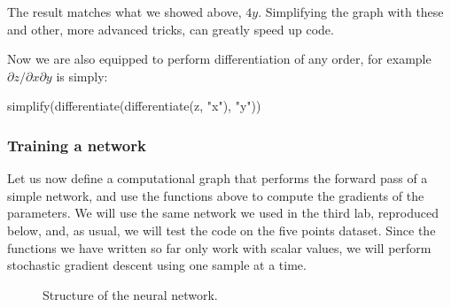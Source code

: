 \documentclass[
  a4paper,
]{article}
\newenvironment{Shaded}{\begin{snugshade}}{\end{snugshade}}
\newcommand{\FunctionTok}[1]{\textcolor[rgb]{0.00,0.00,0.00}{#1}}
\newcommand{\NormalTok}[1]{#1}
\newcommand{\StringTok}[1]{\textcolor[rgb]{0.31,0.60,0.02}{#1}}
\begin{document}
The result matches what we showed above, \(4y\). Simplifying the graph
with these and other, more advanced tricks, can greatly speed up code.

Now we are also equipped to perform differentiation of any order, for
example \(\partial z / \partial x\partial y\) is simply:

\begin{Shaded}
\begin{Highlighting}[]
\FunctionTok{simplify}\NormalTok{(}\FunctionTok{differentiate}\NormalTok{(}\FunctionTok{differentiate}\NormalTok{(z, }\StringTok{"x"}\NormalTok{), }\StringTok{"y"}\NormalTok{))}
\end{Highlighting}
\end{Shaded}

\hypertarget{training-a-network}{%
\subsubsection{Training a network}\label{training-a-network}}

Let us now define a computational graph that performs the forward pass
of a simple network, and use the functions above to compute the
gradients of the parameters. We will use the same network we used in the
third lab, reproduced below, and, as usual, we will test the code on the
five points dataset. Since the functions we have written so far only
work with scalar values, we will perform stochastic gradient descent
using one sample at a time.

\begin{figure}
\centering
{}
\caption{Structure of the neural network.}
\label{fig:ex1net}
\end{figure}
\end{document}
